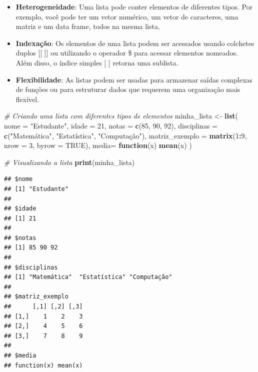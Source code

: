\documentclass[
]{book}
\newenvironment{Shaded}{\begin{snugshade}}{\end{snugshade}}
\newcommand{\AttributeTok}[1]{\textcolor[rgb]{0.13,0.29,0.53}{#1}}
\newcommand{\CommentTok}[1]{\textcolor[rgb]{0.56,0.35,0.01}{\textit{#1}}}
\newcommand{\ConstantTok}[1]{\textcolor[rgb]{0.56,0.35,0.01}{#1}}
\newcommand{\ControlFlowTok}[1]{\textcolor[rgb]{0.13,0.29,0.53}{\textbf{#1}}}
\newcommand{\DecValTok}[1]{\textcolor[rgb]{0.00,0.00,0.81}{#1}}
\newcommand{\FunctionTok}[1]{\textcolor[rgb]{0.13,0.29,0.53}{\textbf{#1}}}
\newcommand{\NormalTok}[1]{#1}
\newcommand{\OtherTok}[1]{\textcolor[rgb]{0.56,0.35,0.01}{#1}}
\newcommand{\SpecialCharTok}[1]{\textcolor[rgb]{0.81,0.36,0.00}{\textbf{#1}}}
\newcommand{\StringTok}[1]{\textcolor[rgb]{0.31,0.60,0.02}{#1}}
\theoremstyle{definition}
\theoremstyle{definition}
\theoremstyle{definition}
\theoremstyle{definition}
\theoremstyle{remark}
\begin{document}
\begin{itemize}
\item
  \textbf{Heterogeneidade}: Uma lista pode conter elementos de diferentes tipos. Por exemplo, você pode ter um vetor numérico, um vetor de caracteres, uma matriz e um data frame, todos na mesma lista.
\item
  \textbf{Indexação}: Os elementos de uma lista podem ser acessados usando colchetes duplos {[}{[} {]}{]} ou utilizando o operador \$ para acessar elementos nomeados. Além disso, o índice simples {[} {]} retorna uma sublista.
\item
  \textbf{Flexibilidade}: As listas podem ser usadas para armazenar saídas complexas de funções ou para estruturar dados que requerem uma organização mais flexível.
\end{itemize}

\begin{Shaded}
\begin{Highlighting}[]
\CommentTok{\# Criando uma lista com diferentes tipos de elementos}
\NormalTok{minha\_lista }\OtherTok{\textless{}{-}} \FunctionTok{list}\NormalTok{(}
  \AttributeTok{nome =} \StringTok{"Estudante"}\NormalTok{,}
  \AttributeTok{idade =} \DecValTok{21}\NormalTok{,}
  \AttributeTok{notas =} \FunctionTok{c}\NormalTok{(}\DecValTok{85}\NormalTok{, }\DecValTok{90}\NormalTok{, }\DecValTok{92}\NormalTok{),}
  \AttributeTok{disciplinas =} \FunctionTok{c}\NormalTok{(}\StringTok{"Matemática"}\NormalTok{, }\StringTok{"Estatística"}\NormalTok{, }\StringTok{"Computação"}\NormalTok{),}
  \AttributeTok{matriz\_exemplo =} \FunctionTok{matrix}\NormalTok{(}\DecValTok{1}\SpecialCharTok{:}\DecValTok{9}\NormalTok{, }\AttributeTok{nrow =} \DecValTok{3}\NormalTok{, }\AttributeTok{byrow =} \ConstantTok{TRUE}\NormalTok{),}
  \AttributeTok{media=} \ControlFlowTok{function}\NormalTok{(x) }\FunctionTok{mean}\NormalTok{(x)}
\NormalTok{)}

\CommentTok{\# Visualizando a lista}
\FunctionTok{print}\NormalTok{(minha\_lista)}
\end{Highlighting}
\end{Shaded}

\begin{verbatim}
## $nome
## [1] "Estudante"
## 
## $idade
## [1] 21
## 
## $notas
## [1] 85 90 92
## 
## $disciplinas
## [1] "Matemática"  "Estatística" "Computação" 
## 
## $matriz_exemplo
##      [,1] [,2] [,3]
## [1,]    1    2    3
## [2,]    4    5    6
## [3,]    7    8    9
## 
## $media
## function(x) mean(x)
\end{verbatim}
\end{document}

